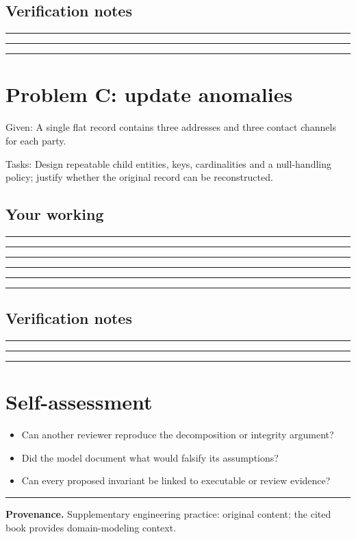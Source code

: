 \documentclass[11pt,letterpaper]{article}
\newcommand{\ResponseLine}{\par\vspace{1.05em}\noindent\rule{\linewidth}{0.4pt}\par}
\newcommand{\ResponseArea}{\ResponseLine\ResponseLine\ResponseLine}
\begin{document}
\subsection{Verification notes}
\ResponseArea

\section{Problem C: update anomalies}
Given: A single flat record contains three addresses and three contact channels for each party.

Tasks: Design repeatable child entities, keys, cardinalities and a null-handling policy; justify whether the original record can be reconstructed.

\subsection{Your working}
\ResponseArea\ResponseArea
\subsection{Verification notes}
\ResponseArea

\section{Self-assessment}
\begin{itemize}
\item Can another reviewer reproduce the decomposition or integrity argument?
\item Did the model document what would falsify its assumptions?
\item Can every proposed invariant be linked to executable or review evidence?
\end{itemize}

\vfill
\hrule
{\footnotesize\textbf{Provenance.} Supplementary engineering practice: original content; the cited book provides domain-modeling context.}
\end{document}
